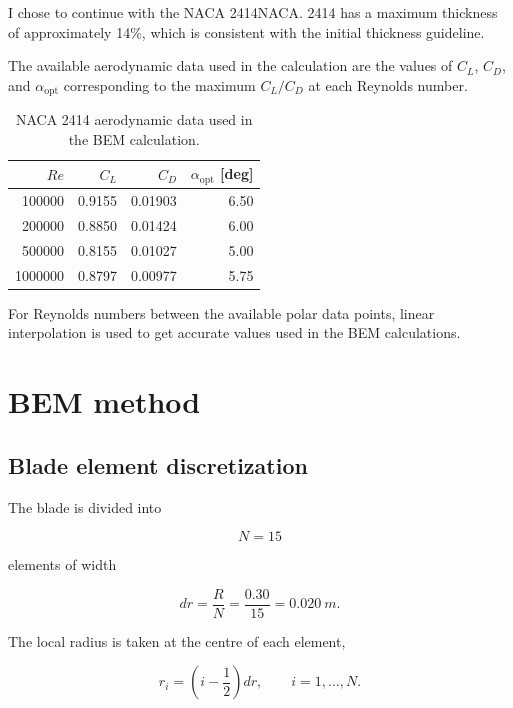 \documentclass[11pt,a4paper]{article}
\begin{document}
I chose to continue with the NACA 2414NACA. 2414 has a maximum thickness of approximately
14\%, which is consistent with the initial thickness guideline.

The available aerodynamic data used in the calculation are the values of
$C_L$, $C_D$, and $\alpha_{\mathrm{opt}}$ corresponding to the maximum
$C_L/C_D$ at each Reynolds number.

\begin{table}[H]
\centering
\label{tab:polar}
\begin{tabular}{rrrr}
    \toprule
    $Re$ & $C_L$ & $C_D$ & $\alpha_{\mathrm{opt}}$ [deg] \\
    \midrule
    100000  & 0.9155 & 0.01903 & 6.50 \\
    200000  & 0.8850 & 0.01424 & 6.00 \\
    500000  & 0.8155 & 0.01027 & 5.00 \\
    1000000 & 0.8797 & 0.00977 & 5.75 \\
    \bottomrule
\end{tabular}
\caption{NACA 2414 aerodynamic data used in the BEM calculation.}
\end{table}

For Reynolds numbers between the available polar data points, linear
interpolation is used to get accurate values used in the BEM calculations.

\section{BEM method}

\subsection{Blade element discretization}

The blade is divided into

\[
    N=15
\]

elements of width

\begin{equation}
    dr=\frac{R}{N}=\frac{0.30}{15}
    =\SI{0.020}{m}.
\end{equation}

The local radius is taken at the centre of each element,

\begin{equation}
    r_i=\left(i-\frac{1}{2}\right)dr,
    \qquad i=1,\ldots,N.
\end{equation}
\end{document}
